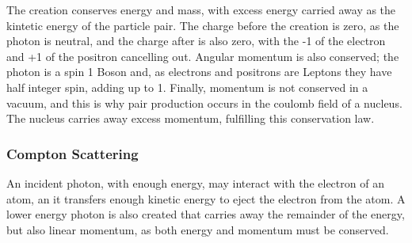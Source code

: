 The creation conserves energy and mass, with excess energy carried away as the kintetic energy of the particle pair.  The charge before the creation is zero, as the photon is neutral, and the charge after is also zero, with the -1 of the electron and +1 of the positron cancelling out.  Angular momentum is also conserved; the photon is a spin 1 Boson and, as electrons and positrons are Leptons they have half integer spin, adding up to 1.  Finally, momentum is not conserved in a vacuum, and this is why pair production occurs in the coulomb field of a nucleus.  The nucleus carries away excess momentum, fulfilling this conservation law.

\begin{figure}[h]
\begin{center}
\end{center}
\end{figure}


\subsubsection{Compton Scattering}

An incident photon, with enough energy, may interact with the electron of an atom, an it transfers enough kinetic energy to eject the electron from the atom.  A lower energy photon is also created that carries away the remainder of the energy, but also linear momentum, as both energy and momentum must be conserved.


\begin{figure}[h]
\begin{center}
\end{center}
\end{figure}


